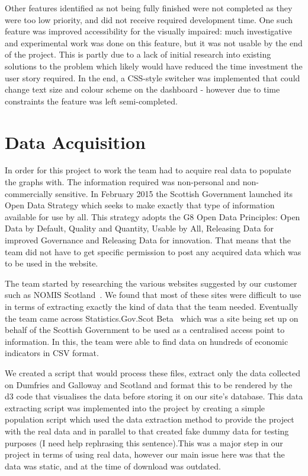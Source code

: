 \documentclass{l3proj}
\begin{document}
Other features identified as not being fully finished were not completed as they were too low priority, and did not receive required development time. One such feature was improved accessibility for the visually impaired: much investigative and experimental work was done on this feature, but it was not usable by the end of the project. This is partly due to a lack of initial research into existing solutions to the problem which likely would have reduced the time investment the user story required. In the end, a CSS-style switcher was implemented that could change text size and colour scheme on the dashboard - however due to time constraints the feature was left semi-completed.



\section{Data Acquisition}
\label{sec:data-acquisition}

In order for this project to work the team had to acquire real data to populate the graphs with. The information required was non-personal and non-commercially sensitive. In February 2015 the Scottish Government launched its Open Data Strategy which seeks to make exactly that type of information available for use by all. This strategy adopts the G8 Open Data Principles: Open Data by Default, Quality and Quantity, Usable by All, Releasing Data for improved Governance and Releasing Data for innovation. That means that the team did not have to get specific permission to post any acquired data which was to be used in the website.

The team started by researching
the various websites suggested by our customer such as NOMIS Scotland~\cite{NOMISScot}. We found that most of these
sites were difficult to use in terms of extracting exactly the kind of data that the team needed. Eventually the team
came across Statistics.Gov.Scot Beta~\cite{StatisticsScotBeta} which was a site being set up on behalf of the Scottish
Government to be used as a centralised access point to information. In this, the team were able to find data on hundreds
of economic indicators in CSV format.

We created a script that would process these files, extract only the data collected on Dumfries and Galloway and
Scotland and format this to be rendered by the d3 code that visualises the data before storing it on our site's
database. This data extracting script was implemented into the project by creating a simple population script which used
the data extraction method to provide the project with the real data and in parallel to that created fake dummy data for
testing purposes (I need help rephrasing this sentence).This was a major step in our project in terms of using real
data, however our main issue here was that the data was static, and at the time of download was outdated.
\end{document}
